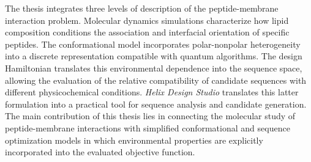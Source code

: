 The thesis integrates three levels of description of the peptide-membrane interaction problem. Molecular dynamics simulations characterize how lipid composition conditions the association and interfacial orientation of specific peptides. The conformational model incorporates polar-nonpolar heterogeneity into a discrete representation compatible with quantum algorithms. The design Hamiltonian translates this environmental dependence into the sequence space, allowing the evaluation of the relative compatibility of candidate sequences with different physicochemical conditions. \textit{Helix Design Studio} translates this latter formulation into a practical tool for sequence analysis and candidate generation. The main contribution of this thesis lies in connecting the molecular study of peptide-membrane interactions with simplified conformational and sequence optimization models in which environmental properties are explicitly incorporated into the evaluated objective function.

